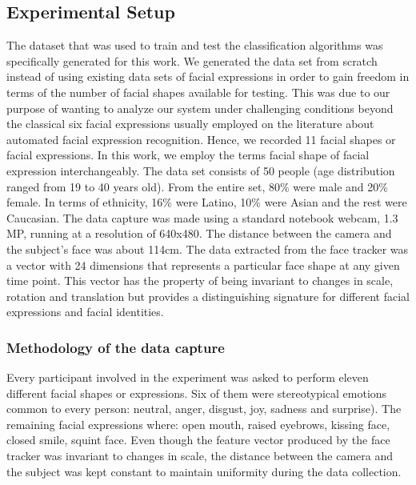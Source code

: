 \documentclass[]{article}
\begin{document}
\subsection{Experimental Setup}
The dataset that was used to train and test the classification algorithms was specifically generated for this work. We
generated the data set from scratch instead of using existing data sets of facial expressions in order to gain freedom
in terms of the number of facial shapes available for testing. This was due to our purpose of wanting to analyze our
system under challenging conditions beyond the classical six facial expressions usually employed on the literature
about automated facial expression  recognition. Hence, we recorded 11 facial shapes or facial expressions. In this work, we
employ the terms facial shape of facial expression interchangeably. The data set consists of 50 people (age
distribution ranged from 19 to 40 years old). From the entire set, 80\% were male and 20\% female. In terms of
ethnicity, 16\% were Latino, 10\% were Asian and the rest were Caucasian. The data capture was made using a standard
notebook webcam, 1.3 MP, running at a resolution of 640x480. The distance between the camera and the subject's face was
about 114cm. The data extracted from the face tracker was a vector with 24 dimensions that represents a particular face
shape at any given time point. This vector has the property of being invariant to changes in scale, rotation and
translation but provides a distinguishing signature for different facial expressions and facial identities.


\subsubsection{Methodology of the data capture}
Every participant involved in the experiment was asked to perform eleven different facial shapes or expressions.
Six of them were stereotypical emotions common to every person: neutral, anger, disgust, joy, sadness and surprise). The
remaining facial expressions where: open mouth, raised eyebrows, kissing face, closed smile, squint face.
Even though the feature vector produced  by the face tracker was invariant to changes in scale, the distance between the
camera and the subject was kept constant to maintain uniformity during the data collection.
\end{document}
